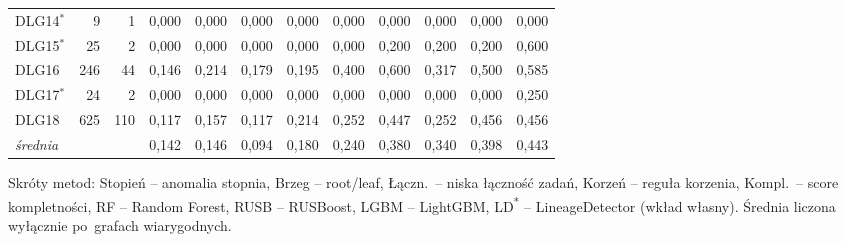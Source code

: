 \begin{table}[ht]
\begin{tabular}{lrrccccccccc}
DLG14$^{*}$ & 9 & 1 & 0{,}000 & 0{,}000 & 0{,}000 & 0{,}000 & 0{,}000 & 0{,}000 & 0{,}000 & 0{,}000 & 0{,}000 \\
DLG15$^{*}$ & 25 & 2 & 0{,}000 & 0{,}000 & 0{,}000 & 0{,}000 & 0{,}000 & 0{,}200 & 0{,}200 & 0{,}200 & 0{,}600 \\
DLG16 & 246 & 44 & 0{,}146 & 0{,}214 & 0{,}179 & 0{,}195 & 0{,}400 & 0{,}600 & 0{,}317 & 0{,}500 & 0{,}585 \\
DLG17$^{*}$ & 24 & 2 & 0{,}000 & 0{,}000 & 0{,}000 & 0{,}000 & 0{,}000 & 0{,}000 & 0{,}000 & 0{,}000 & 0{,}250 \\
DLG18 & 625 & 110 & 0{,}117 & 0{,}157 & 0{,}117 & 0{,}214 & 0{,}252 & 0{,}447 & 0{,}252 & 0{,}456 & 0{,}456 \\
\midrule
\emph{średnia} & & & 0{,}142 & 0{,}146 & 0{,}094 & 0{,}180 & 0{,}240 & 0{,}380 & 0{,}340 & 0{,}398 & 0{,}443 \\
\bottomrule
\end{tabular}

\vspace{0.4em}
\footnotesize Skróty metod: Stopień – anomalia stopnia, Brzeg – root/leaf, Łączn.\ – niska łączność zadań, Korzeń – reguła korzenia, Kompl.\ – score kompletności, RF – Random Forest, RUSB – RUSBoost, LGBM – LightGBM, LD\textsuperscript{*} – LineageDetector (wkład własny). Średnia liczona wyłącznie po~grafach wiarygodnych.
\end{table}

\clearpage

